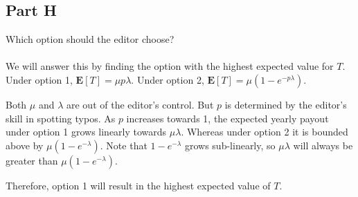 \documentclass{amsart}
\begin{document}
	\subsection{Part H}
	Which option should the editor choose?\\
	\\
	We will answer this by finding the option with the highest expected value for $T$. Under option 1, $\mathbf{E}[T] = \mu p\lambda$. Under option 2, $\mathbf{E}[T] = \mu(1-e^{-p\lambda})$.
	
	Both $\mu$ and $\lambda$ are out of the editor's control. But $p$ is determined by the editor's skill in spotting typos. As $p$ increases towards 1, the expected yearly payout under option 1 grows linearly towards $\mu\lambda$. Whereas under option 2 it is bounded above by $\mu(1-e^{-\lambda})$. Note that $1-e^{-\lambda}$ grows sub-linearly, so $\mu\lambda$ will always be greater than $\mu(1-e^{-\lambda})$.
	
	Therefore, option 1 will result in the highest expected value of $T$. 
\end{document}
